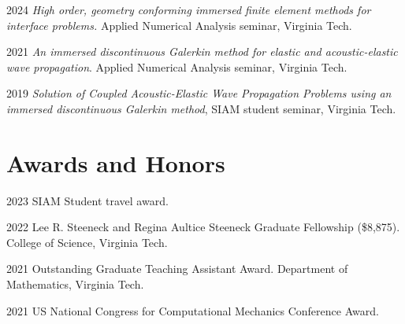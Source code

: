 \documentclass[11pt,letterpaper]{report}
\begin{document}
    \begin{tablist}
        \item[2024] \tab{}\textit{
            High order, geometry conforming immersed finite element methods for interface problems. 
        } Applied Numerical Analysis seminar, Virginia Tech. 
        \item[2021] \tab{}\textit{An immersed discontinuous Galerkin method for elastic and
        acoustic-elastic wave propagation}. Applied Numerical Analysis seminar, Virginia Tech. 

        \item[2019]\tab{}\textit{Solution of Coupled Acoustic-Elastic Wave Propagation Problems using an immersed discontinuous Galerkin method}, SIAM student seminar, Virginia Tech.






    \end{tablist}



    

   

   
    \section*{Awards and Honors}


    \begin{tablist}
        \item[2023] \tab{}SIAM Student travel award. 

        \item[2022] \tab{}Lee R. Steeneck and Regina Aultice Steeneck Graduate Fellowship (\$8,875). College of Science, Virginia Tech. 
        

        \item[2021] \tab{}Outstanding Graduate Teaching Assistant Award. Department of Mathematics, Virginia Tech.
        
        \item[2021]\tab{}US National Congress for Computational Mechanics Conference Award.
      

    \end{tablist}
\end{document}
